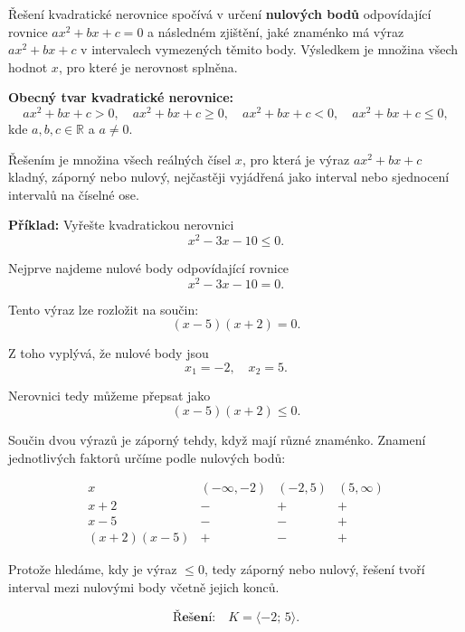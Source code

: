 \documentclass[12pt,a4paper]{article}
\begin{document}
Řešení kvadratické nerovnice spočívá v určení \textbf{nulových bodů} odpovídající rovnice \(ax^2 + bx + c = 0\)  
a následném zjištění, jaké znaménko má výraz \(ax^2 + bx + c\) v intervalech vymezených těmito body.  
Výsledkem je množina všech hodnot \(x\), pro které je nerovnost splněna.

\begin{definitionbox}
\textbf{Obecný tvar kvadratické nerovnice:}
\[
ax^2 + bx + c > 0, \quad ax^2 + bx + c \ge 0, \quad ax^2 + bx + c < 0, \quad ax^2 + bx + c \le 0,
\]
kde \(a, b, c \in \mathbb{R}\) a \(a \neq 0\).

Řešením je množina všech reálných čísel \(x\), pro která je výraz \(ax^2 + bx + c\) kladný, záporný nebo nulový,  
nejčastěji vyjádřená jako interval nebo sjednocení intervalů na číselné ose.
\end{definitionbox}

\begin{examplebox}
\textbf{Příklad:}  
Vyřešte kvadratickou nerovnici
\[
x^2 - 3x - 10 \le 0.
\]

Nejprve najdeme nulové body odpovídající rovnice
\[
x^2 - 3x - 10 = 0.
\]

Tento výraz lze rozložit na součin:
\[
(x - 5)(x + 2) = 0.
\]

Z toho vyplývá, že nulové body jsou
\[
x_1 = -2, \quad x_2 = 5.
\]

Nerovnici tedy můžeme přepsat jako
\[
(x - 5)(x + 2) \le 0.
\]

Součin dvou výrazů je záporný tehdy, když mají různé znaménko.  
Znamení jednotlivých faktorů určíme podle nulových bodů:

\[
\begin{array}{c|ccc}
x & (-\infty,-2) & (-2,5) & (5,\infty) \\ \hline
x+2 & - & + & + \\
x-5 & - & - & + \\ \hline
(x+2)(x-5) & + & - & +
\end{array}
\]

Protože hledáme, kdy je výraz \(\le 0\), tedy záporný nebo nulový,  
řešení tvoří interval mezi nulovými body včetně jejich konců.

\[
\textbf{Řešení:} \quad K = \langle -2;\,5 \rangle.
\]
\end{examplebox}




\end{document}
